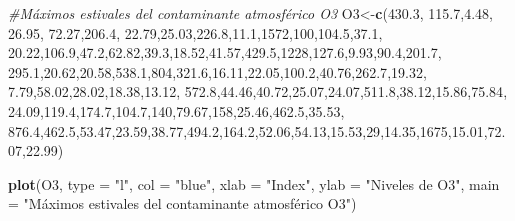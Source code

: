 \documentclass[
  oneside]{article}
\newenvironment{Shaded}{\begin{snugshade}}{\end{snugshade}}
\newcommand{\AttributeTok}[1]{\textcolor[rgb]{0.13,0.29,0.53}{#1}}
\newcommand{\CommentTok}[1]{\textcolor[rgb]{0.56,0.35,0.01}{\textit{#1}}}
\newcommand{\DecValTok}[1]{\textcolor[rgb]{0.00,0.00,0.81}{#1}}
\newcommand{\FloatTok}[1]{\textcolor[rgb]{0.00,0.00,0.81}{#1}}
\newcommand{\FunctionTok}[1]{\textcolor[rgb]{0.13,0.29,0.53}{\textbf{#1}}}
\newcommand{\NormalTok}[1]{#1}
\newcommand{\OtherTok}[1]{\textcolor[rgb]{0.56,0.35,0.01}{#1}}
\newcommand{\StringTok}[1]{\textcolor[rgb]{0.31,0.60,0.02}{#1}}
\begin{document}
\begin{Shaded}
\begin{Highlighting}[]
\CommentTok{\#Máximos estivales del contaminante atmosférico O3}
\NormalTok{O3}\OtherTok{\textless{}{-}}\FunctionTok{c}\NormalTok{(}\FloatTok{430.3}\NormalTok{, }\FloatTok{115.7}\NormalTok{,}\FloatTok{4.48}\NormalTok{, }\FloatTok{26.95}\NormalTok{, }\FloatTok{72.27}\NormalTok{,}\FloatTok{206.4}\NormalTok{, }\FloatTok{22.79}\NormalTok{,}\FloatTok{25.03}\NormalTok{,}\FloatTok{226.8}\NormalTok{,}\FloatTok{11.1}\NormalTok{,}\DecValTok{1572}\NormalTok{,}\DecValTok{100}\NormalTok{,}\FloatTok{104.5}\NormalTok{,}\FloatTok{37.1}\NormalTok{,}
      \FloatTok{20.22}\NormalTok{,}\FloatTok{106.9}\NormalTok{,}\FloatTok{47.2}\NormalTok{,}\FloatTok{62.82}\NormalTok{,}\FloatTok{39.3}\NormalTok{,}\FloatTok{18.52}\NormalTok{,}\FloatTok{41.57}\NormalTok{,}\FloatTok{429.5}\NormalTok{,}\DecValTok{1228}\NormalTok{,}\FloatTok{127.6}\NormalTok{,}\FloatTok{9.93}\NormalTok{,}\FloatTok{90.4}\NormalTok{,}\FloatTok{201.7}\NormalTok{,}
      \FloatTok{295.1}\NormalTok{,}\FloatTok{20.62}\NormalTok{,}\FloatTok{20.58}\NormalTok{,}\FloatTok{538.1}\NormalTok{,}\DecValTok{804}\NormalTok{,}\FloatTok{321.6}\NormalTok{,}\FloatTok{16.11}\NormalTok{,}\FloatTok{22.05}\NormalTok{,}\FloatTok{100.2}\NormalTok{,}\FloatTok{40.76}\NormalTok{,}\FloatTok{262.7}\NormalTok{,}\FloatTok{19.32}\NormalTok{,}
\FloatTok{7.79}\NormalTok{,}\FloatTok{58.02}\NormalTok{,}\FloatTok{28.02}\NormalTok{,}\FloatTok{18.38}\NormalTok{,}\FloatTok{13.12}\NormalTok{,}
\FloatTok{572.8}\NormalTok{,}\FloatTok{44.46}\NormalTok{,}\FloatTok{40.72}\NormalTok{,}\FloatTok{25.07}\NormalTok{,}\FloatTok{24.07}\NormalTok{,}\FloatTok{511.8}\NormalTok{,}\FloatTok{38.12}\NormalTok{,}\FloatTok{15.86}\NormalTok{,}\FloatTok{75.84}\NormalTok{,}
\FloatTok{24.09}\NormalTok{,}\FloatTok{119.4}\NormalTok{,}\FloatTok{174.7}\NormalTok{,}\FloatTok{104.7}\NormalTok{,}\DecValTok{140}\NormalTok{,}\FloatTok{79.67}\NormalTok{,}\DecValTok{158}\NormalTok{,}\FloatTok{25.46}\NormalTok{,}\FloatTok{462.5}\NormalTok{,}\FloatTok{35.53}\NormalTok{,}
\FloatTok{876.4}\NormalTok{,}\FloatTok{462.5}\NormalTok{,}\FloatTok{53.47}\NormalTok{,}\FloatTok{23.59}\NormalTok{,}\FloatTok{38.77}\NormalTok{,}\FloatTok{494.2}\NormalTok{,}\FloatTok{164.2}\NormalTok{,}\FloatTok{52.06}\NormalTok{,}\FloatTok{54.13}\NormalTok{,}\FloatTok{15.53}\NormalTok{,}\DecValTok{29}\NormalTok{,}\FloatTok{14.35}\NormalTok{,}\DecValTok{1675}\NormalTok{,}\FloatTok{15.01}\NormalTok{,}\FloatTok{72.07}\NormalTok{,}\FloatTok{22.99}\NormalTok{)}

\FunctionTok{plot}\NormalTok{(O3, }\AttributeTok{type =} \StringTok{"l"}\NormalTok{, }\AttributeTok{col =} \StringTok{"blue"}\NormalTok{, }\AttributeTok{xlab =} \StringTok{"Index"}\NormalTok{, }\AttributeTok{ylab =} \StringTok{"Niveles de O3"}\NormalTok{, }\AttributeTok{main =} \StringTok{"Máximos estivales del contaminante atmosférico O3"}\NormalTok{)}
\end{Highlighting}
\end{Shaded}
\end{document}
